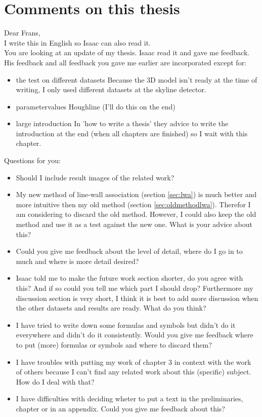 \section{Comments on this thesis}
Dear Frans,\\

I write this in English so Isaac can also read it.\\
You are looking at an update of my thesis. Isaac read it and gave me feedback. His feedback and all feedback you gave me earlier are incorporated except for:\\
\begin{itemize}
\item the test on different datasets
Because the 3D model isn't ready at the time of writing, 
I only used different datasets at the skyline detector.
\item parametervalues Houghline
(I'll do this on the end)
\item large introduction
In 'how to write a thesis' they advice to write the introduction at the end
(when all chapters are finished) so I wait with this chapter.
\end{itemize}

Questions for you:\\
\begin{itemize}
\item Should I include result images of the related work?
\item My new method of line-wall association (section \ref{sec:lwa}) is much better and
more intuitive then my old method (section \ref{sec:oldmethodlwa}). Therefor I am considering to discard the old method. However, I could also keep the old method and use it as
a test against the new one. What is your advice about this?\\
\item Could you give me feedback about the level of detail, where do I go in to much and where is more detail desired?\\
\item Isaac told me to make the future work section shorter, do you agree
with this? And if so could you tell me which part I should drop?
Furthermore my discussion section is very short, I think it is best to add more discussion when the other datasets and results are ready. What do you think?\\
\item I have tried to write down some formulas and symbols but didn't do it everywhere and didn't do it consistently. Would you give me feedback where to put (more) formulas or symbols and where to discard them?\\
\item I have troubles with putting my work of chapter 3 in context with the work of others because I can't find any related work about this (specific) subject.  How do I deal with that?\\
\item I have difficulties with deciding wheter to put a text in the preliminaries, chapter or in an appendix. Could you give me feedback about this?
\end{itemize}

